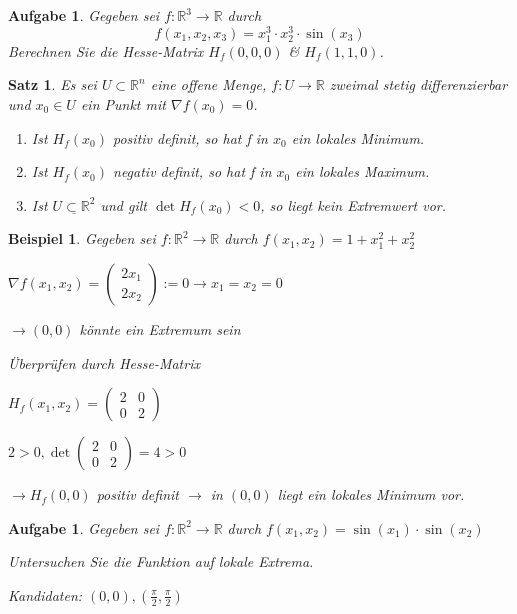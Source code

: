 \documentclass[12pt,a4paper]{scrreprt}
\newtheorem{beispiel}[defi]{Beispiel}
\newtheorem{satz}[defi]{Satz}
\newtheorem{aufg}[defi]{Aufgabe}
\begin{document}
\begin{aufg}
	Gegeben sei $f:\mathbb{R}^3\to\mathbb{R}$ durch
	\[f(x_1,x_2,x_3)=x_1^3 \cdot x_2^3 \cdot \sin(x_3)\]
	Berechnen Sie die Hesse-Matrix $H_f(0,0,0)$ \& $H_f(1,1,0)$.
\end{aufg}

\begin{satz}
	Es sei $U\subset\mathbb{R}^n$ eine offene Menge, $f:U\to\mathbb{R}$ zweimal stetig differenzierbar und $x_0\in U$ ein Punkt mit $\nabla f(x_0)=0$.
	\begin{enumerate}[label=\emph{(\roman*)}]
		\item Ist $H_f(x_0)$ positiv definit, so hat f in $x_0$ ein lokales Minimum.
		\item Ist $H_f(x_0)$ negativ definit, so hat f in $x_0$ ein lokales Maximum.
		\item Ist $\underline{U\subset\mathbb{R}^2}$ und gilt $\det H_f(x_0) < 0$, so liegt kein Extremwert vor.
	\end{enumerate}
\end{satz}

\begin{beispiel}
	Gegeben sei $f:\mathbb{R}^2\to\mathbb{R}$ durch $f(x_1,x_2)=1+x_1^2+x_2^2$
	
	$\nabla f(x_1,x_2)=\begin{pmatrix}
	2x_1 \\ 2x_2
	\end{pmatrix} := 0 \to x_1=x_2=0$
	
	$\to (0,0)$ könnte ein Extremum sein
	
	Überprüfen durch Hesse-Matrix
	
	$H_f(x_1,x_2)=\begin{pmatrix}
	2 & 0 \\ 0 & 2
	\end{pmatrix}$
	
	$2>0, \det\begin{pmatrix}
	2 & 0 \\ 0 & 2
	\end{pmatrix}=4>0$
	
	$\to H_f(0,0)$ positiv definit $\to$ in $(0,0)$ liegt ein lokales Minimum vor.
\end{beispiel}

\begin{aufg}
	Gegeben sei $f:\mathbb{R}^2\to\mathbb{R}$ durch $f(x_1,x_2)=\sin(x_1)\cdot\sin(x_2)$
	
	Untersuchen Sie die Funktion auf lokale Extrema.
	
	Kandidaten: $(0,0),(\frac{\pi}{2},\frac{\pi}{2})$
\end{aufg}
\end{document}

